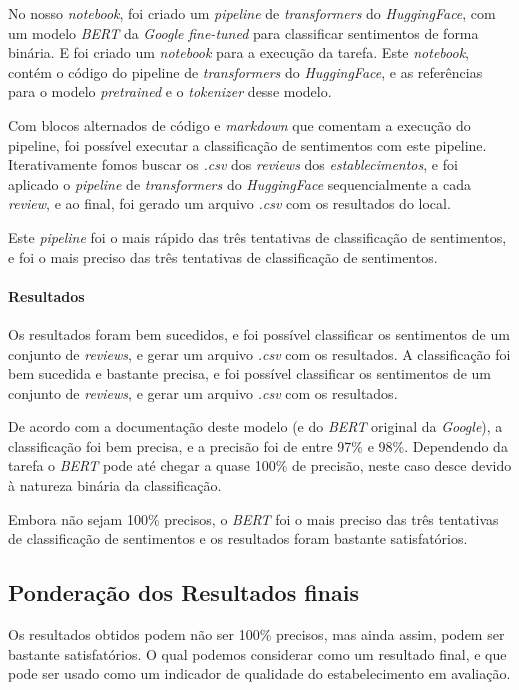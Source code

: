 No nosso \textit{notebook}, foi criado um \textit{pipeline} de \textit{transformers} do \textit{HuggingFace}, com um modelo \textit{BERT} da \textit{Google} \textit{fine-tuned}\cite{hf1} para classificar sentimentos de forma binária. E foi criado um \textit{notebook} para a execução da tarefa. Este \textit{notebook}, contém o código do pipeline de \textit{transformers} do \textit{HuggingFace}, e as referências para o modelo \textit{pretrained} e o \textit{tokenizer} desse modelo.

Com blocos alternados de código e \textit{markdown} que comentam a execução do pipeline, foi possível executar a classificação de sentimentos com este pipeline. Iterativamente fomos buscar os \textit{.csv} dos \textit{reviews} dos \textit{establecimentos}, e foi aplicado o \textit{pipeline} de \textit{transformers} do \textit{HuggingFace} sequencialmente a cada \textit{review}, e ao final, foi gerado um arquivo \textit{.csv} com os resultados do local.

Este \textit{pipeline} foi o mais rápido das três tentativas de classificação de sentimentos, e foi o mais preciso das três tentativas de classificação de sentimentos.

\paragraph{Resultados\\}

Os resultados foram bem sucedidos, e foi possível classificar os sentimentos de um conjunto de \textit{reviews}, e gerar um arquivo \textit{.csv} com os resultados. A classificação foi bem sucedida e bastante precisa, e foi possível classificar os sentimentos de um conjunto de \textit{reviews}, e gerar um arquivo \textit{.csv} com os resultados.

De acordo com a documentação deste modelo (e do \textit{BERT} original da \textit{Google}), a classificação foi bem precisa, e a precisão foi de entre 97\% e 98\%. Dependendo da tarefa o \textit{BERT} pode até chegar a quase 100\% de precisão, neste caso desce devido à natureza binária da classificação.

Embora não sejam 100\% precisos, o \textit{BERT} foi o mais preciso das três tentativas de classificação de sentimentos e os resultados foram bastante satisfatórios.

\subsection{Ponderação dos Resultados finais}

Os resultados obtidos podem não ser 100\% precisos, mas ainda assim, podem ser bastante satisfatórios. O qual podemos considerar como um resultado final, e que pode ser usado como um indicador de qualidade do estabelecimento em avaliação.